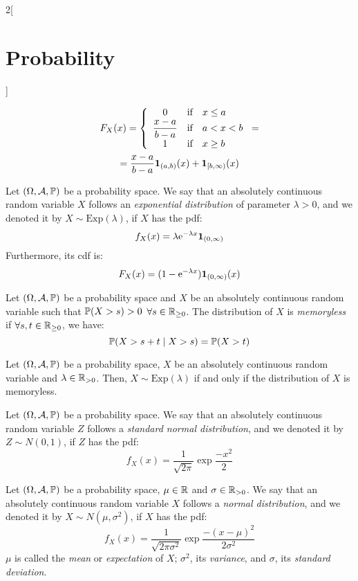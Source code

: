 \documentclass[../../../main.tex]{subfiles}
\begin{document}
\begin{multicols}{2}[\section{Probability}]
\begin{definition}
    \begin{multline*}
      F_X(x)=\left\{
      \begin{array}{ccl}
        0                            & \text{if} & x\leq a \\
        \displaystyle\frac{x-a}{b-a} & \text{if} & a<x<b   \\
        1                            & \text{if} & x\geq b \\
      \end{array}
      \right.=\\=\frac{x-a}{b-a}\boldsymbol{\mathrm{1}}_{(a,b)}(x)+\boldsymbol{\mathrm{1}}_{[b,\infty)}(x)
    \end{multline*}
  \end{definition}
  \begin{definition}
    Let $(\Omega,\mathcal{A},\mathbb{P})$ be a probability space. We say that an absolutely continuous random variable $X$ follows an \textit{exponential distribution} of parameter $\lambda>0$, and we denoted it by $X\sim \text{Exp}(\lambda)$, if $X$ has the pdf: $$f_X(x)=\lambda\mathrm{e}^{-\lambda x}\boldsymbol{\mathrm{1}}_{(0,\infty)}$$ Furthermore, its cdf is:
    $$F_X(x)=(1-\mathrm{e}^{-\lambda x})\boldsymbol{\mathrm{1}}_{(0,\infty)}(x)$$
  \end{definition}
  \begin{definition}
    Let $(\Omega,\mathcal{A},\mathbb{P})$ be a probability space and $X$ be an absolutely continuous random variable such that $\mathbb{P}(X >s)>0$ $\forall s\in\mathbb{R}_{\geq 0}$. The distribution of $X$ is \textit{memoryless} if $\forall s,t\in\mathbb{R}_{\geq 0}$, we have: $$\mathbb{P}(X>s+t\mid X >s)=\mathbb{P}(X>t)$$
  \end{definition}
  \begin{prop}
    Let $(\Omega,\mathcal{A},\mathbb{P})$ be a probability space, $X$ be an absolutely continuous random variable and $\lambda\in\mathbb{R}_{>0}$. Then, $X\sim\text{Exp}(\lambda)$ if and only if the distribution of $X$ is memoryless.
  \end{prop}
  \begin{definition}
    Let $(\Omega,\mathcal{A},\mathbb{P})$ be a probability space. We say that an absolutely continuous random variable $Z$ follows a \textit{standard normal distribution}, and we denoted it by $Z\sim N(0,1)$, if $Z$ has the pdf: $$f_X(x)=\frac{1}{\sqrt{2\pi}}\exp{\frac{-x^2}{2}}$$
  \end{definition}
  \begin{definition}
    Let $(\Omega,\mathcal{A},\mathbb{P})$ be a probability space, $\mu\in\mathbb{R}$ and $\sigma\in\mathbb{R}_{>0}$. We say that an absolutely continuous random variable $X$ follows a \textit{normal distribution}, and we denoted it by $X\sim N(\mu,\sigma^2)$, if $X$ has the pdf: $$f_X(x)=\frac{1}{\sqrt{2\pi\sigma^2}}\exp{\frac{-{(x-\mu)}^2}{2\sigma^2}}$$ $\mu$ is called the \textit{mean} or \textit{expectation} of $X$; $\sigma^2$, its \textit{variance}, and $\sigma$, its \textit{standard deviation}.

\end{definition}
\end{multicols}
\end{document}
